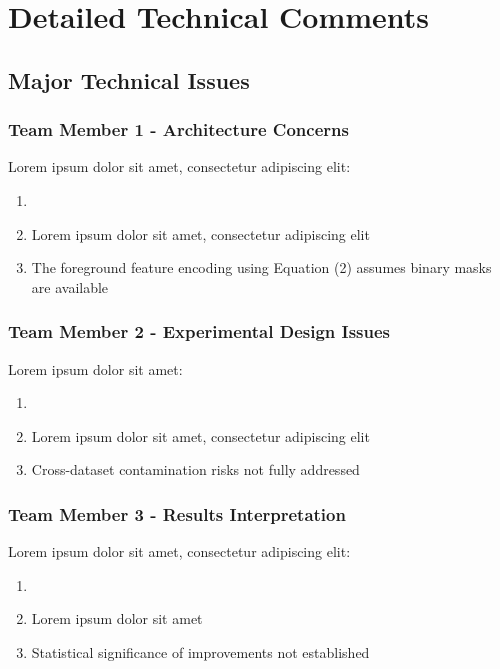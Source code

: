 \section*{Detailed Technical Comments}
\label{sec:detailed_comments}

\subsection{Major Technical Issues}
\subsubsection{Team Member 1 - Architecture Concerns}
Lorem ipsum dolor sit amet, consectetur adipiscing elit:
\begin{enumerate}
    \item {}
    \item Lorem ipsum dolor sit amet, consectetur adipiscing elit
    \item The foreground feature encoding using Equation (2) assumes binary masks are available
\end{enumerate}

\subsubsection{Team Member 2 - Experimental Design Issues}
Lorem ipsum dolor sit amet:
\begin{enumerate}
    \item {}
    \item Lorem ipsum dolor sit amet, consectetur adipiscing elit
    \item Cross-dataset contamination risks not fully addressed
\end{enumerate}

\subsubsection{Team Member 3 - Results Interpretation}
Lorem ipsum dolor sit amet, consectetur adipiscing elit:
\begin{enumerate}
    \item {}
    \item Lorem ipsum dolor sit amet
    \item Statistical significance of improvements not established
\end{enumerate}

